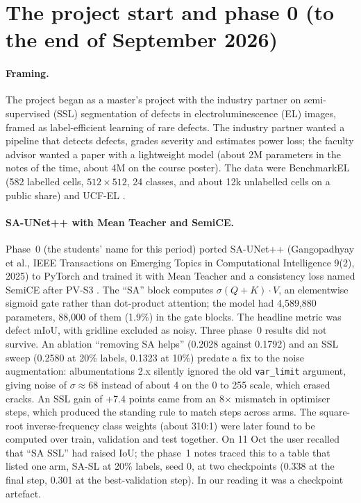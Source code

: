 \section{The project start and phase 0 (to the end of September 2026)}\label{sec:repro-phase0}

\paragraph{Framing.} The project began as a master's project with the industry partner on semi-supervised (SSL) segmentation of
defects in electroluminescence (EL) images, framed as label-efficient learning of rare defects. The industry partner wanted a pipeline
that detects defects, grades severity and estimates power loss; the faculty advisor wanted a paper with a lightweight model (about 2M
parameters in the notes of the time, about 4M on the course poster). The data were BenchmarkEL \citep{pratt2023benchmark} (582
labelled cells, $512 \times 512$, 24 classes, and about 12k unlabelled cells on a public share) and UCF-EL \citep{fioresi2022ucfel}.

\paragraph{SA-UNet++ with Mean Teacher and SemiCE.} Phase~0 (the students' name for this period) ported SA-UNet++
(Gangopadhyay et al., IEEE Transactions on Emerging Topics in Computational Intelligence 9(2), 2025) to PyTorch and trained it with Mean Teacher
\citep{tarvainen2017meanteacher} and a consistency loss named SemiCE after PV-S3 \citep{jha2025pvs3}. The ``SA'' block computes
$\sigma(Q+K) \cdot V$, an elementwise sigmoid gate rather than dot-product attention; the model had 4,589,880 parameters, 88,000 of them
(1.9\%) in the gate blocks. The headline metric was defect mIoU, with gridline excluded as noisy. Three phase~0 results did not
survive. An ablation ``removing SA helps'' (0.2028 against 0.1792) and an SSL sweep (0.2580 at 20\% labels, 0.1323 at 10\%) predate a
fix to the noise augmentation: albumentations 2.x silently ignored the old \texttt{var\_limit} argument, giving noise of
$\sigma \approx 68$ instead of about 4 on the 0 to 255 scale, which erased cracks. An SSL gain of +7.4 points came from an 8$\times$
mismatch in optimiser steps, which produced the standing rule to match steps across arms. The square-root inverse-frequency class
weights (about 310:1) were later found to be computed over train, validation and test together. On 11 Oct the user recalled that
``SA SSL'' had raised IoU; the phase~1 notes traced this to a table that listed one arm, SA-SL at 20\% labels, seed 0, at two
checkpoints (0.338 at the final step, 0.301 at the best-validation step). In our reading it was a checkpoint artefact.

